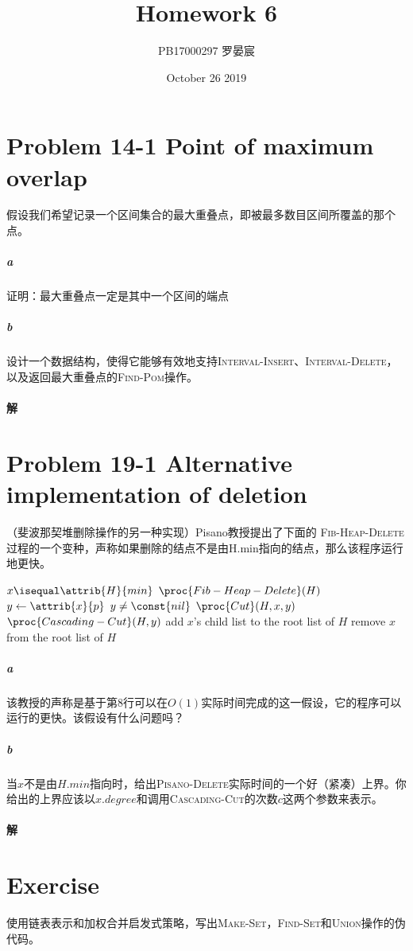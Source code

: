 \documentclass{article}
\title{Homework 6}
\author{PB17000297 罗晏宸}
\date{October 26 2019}
\begin{document}
\maketitle

\section{Problem 14-1 Point of maximum overlap}
假设我们希望记录一个区间集合的最大重叠点，即被最多数目区间所覆盖的那个点。
\subparagraph*{a}
证明：最大重叠点一定是其中一个区间的端点
\subparagraph*{b}
设计一个数据结构，使得它能够有效地支持\textsc{Interval-Insert}、\textsc{Interval-Delete}，以及返回最大重叠点的\textsc{Find-Pom}操作。
\paragraph{解}

\section{Problem 19-1 Alternative implementation of deletion}
（斐波那契堆删除操作的另一种实现）Pisano教授提出了下面的 \textsc{Fib-Heap-Delete}过程的一个变种，声称如果删除的结点不是由H.min指向的结点，那么该程序运行地更快。
\begin{codebox}
\li	\If $x \isequal \attrib{H}{min}$ \Then
\li		$\proc{Fib-Heap-Delete}(H)$
\li \Else
\li		$y \gets \attrib{x}{p}$
\li		\If $y \neq \const{nil}$ \Then
\li			$\proc{Cut}(H,x,y)$
\li			$\proc{Cascading-Cut}(H,y)$
		\End
\li		add $x$'s child list to the root list of $H$
\li		remove $x$ from the root list of $H$
\end{codebox}
\subparagraph*{a}
该教授的声称是基于第8行可以在$O(1)$实际时间完成的这一假设，它的程序可以运行的更快。该假设有什么问题吗？
\subparagraph*{b}
当$x$不是由$H.min$指向时，给出\textsc{Pisano-Delete}实际时间的一个好（紧凑）上界。你给出的上界应该以$x.degree$和调用\textsc{Cascading-Cut}的次数$c$这两个参数来表示。

\paragraph{解}

\section{Exercise}
使用链表表示和加权合并启发式策略，写出\textsc{Make-Set}，\textsc{Find-Set}和\textsc{Union}操作的伪代码。
\end{document}
